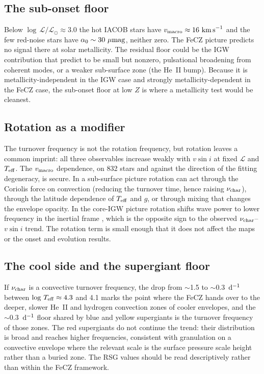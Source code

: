\documentclass[twocolumn]{aastex631}
\newcommand{\vmac}{v_{\rm macro}}
\newcommand{\vsini}{v\sin i}
\newcommand{\teff}{T_{\rm eff}}
\newcommand{\nuchar}{\nu_{\rm char}}
\renewcommand{\ell}{\mathcal{L}}
\newcommand{\lgL}{\log\,\ell/\ell_\odot}
\newcommand{\lgT}{\log\,\teff}
\newcommand{\umag}{\mu{\rm mag}}
\newcommand{\dinv}{{\rm d}^{-1}}
\newcommand{\kms}{{\rm km\,s}^{-1}}
\begin{document}
\subsection{The sub-onset floor}\label{sec:floor}

Below $\lgL\approx3.0$ the hot IACOB stars have $\vmac\approx16~\kms$ and the few red-noise stars have $\alpha_0\sim30~\umag$, neither zero. The FeCZ picture predicts no signal there at solar metallicity. The residual floor could be the IGW contribution that \citet{anders2023} predict to be small but nonzero, pulsational broadening from coherent modes, or a weaker sub-surface zone (the He~II bump). Because it is metallicity-independent in the IGW case and strongly metallicity-dependent in the FeCZ case, the sub-onset floor at low $Z$ is where a metallicity test would be cleanest.

\subsection{Rotation as a modifier}\label{sec:rot_disc}

The turnover frequency is not the rotation frequency, but rotation leaves a common imprint: all three observables increase weakly with $\vsini$ at fixed $\ell$ and $\teff$. The $\vmac$ dependence, on 832 stars and against the direction of the fitting degeneracy, is secure. In a sub-surface picture rotation can act through the Coriolis force on convection (reducing the turnover time, hence raising $\nuchar$), through the latitude dependence of $\teff$ and $g$, or through mixing that changes the envelope opacity. In the core-IGW picture rotation shifts wave power to lower frequency in the inertial frame \citep{aerts2015}, which is the opposite sign to the observed $\nuchar$--$\vsini$ trend. The rotation term is small enough that it does not affect the maps or the onset and evolution results.

\subsection{The cool side and the supergiant floor}\label{sec:cool_disc}

If $\nuchar$ is a convective turnover frequency, the drop from $\sim$1.5 to $\sim$0.3~$\dinv$ between $\lgT\approx4.3$ and 4.1 marks the point where the FeCZ hands over to the deeper, slower He~II and hydrogen convection zones of cooler envelopes, and the $\sim$0.3~$\dinv$ floor shared by blue and yellow supergiants is the turnover frequency of those zones. The red supergiants do not continue the trend: their distribution is broad and reaches higher frequencies, consistent with granulation on a convective envelope where the relevant scale is the surface pressure scale height rather than a buried zone. The RSG values should be read descriptively rather than within the FeCZ framework.
\end{document}
